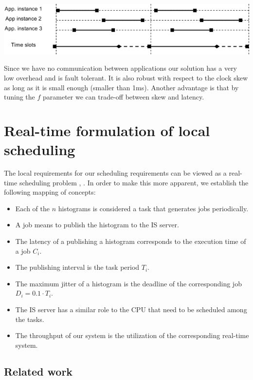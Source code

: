 \begin{center}
\includegraphics[scale=0.6]{Images/local_sched.png}
\end{center}

Since we have no communication between applications our solution has a very low overhead and is fault tolerant. It is also robust with respect to the clock skew as long as it is small enough (smaller than 1ms). Another advantage is that by tuning the $f$ parameter we can trade-off between skew and latency. 

\section*{Real-time formulation of local scheduling}

The local requirements for our scheduling requirements can be viewed as a real-time scheduling problem \citep{liu1973scheduling}, \citep{sha2004real}. In order to make this more apparent, we establish the following mapping of concepts:
\begin{itemize}
\item Each of the $n$ histograms is considered a task that generates jobs periodically. 
\item A job means to publish the histogram to the IS server.
\item The latency of a publishing a histogram corresponds to the execution time of a job $C_i$.
\item The publishing interval is the task period $T_i$. 
\item The maximum jitter of a histogram is the deadline of the corresponding job $D_i=0.1\cdot T_i$.
\item The IS server has a similar role to the CPU that need to be scheduled among the tasks.
\item The throughput of our system is the utilization of the corresponding real-time system.
\end{itemize}

\subsection*{Related work}

